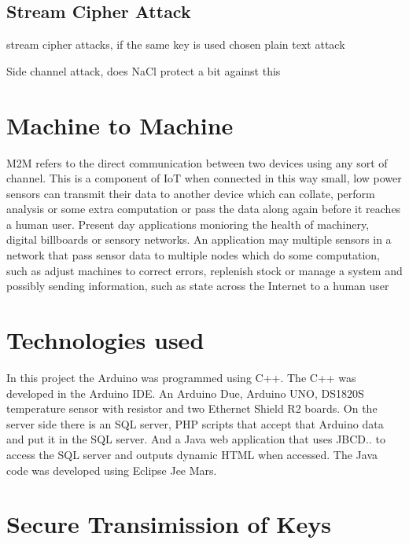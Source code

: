 \subsection{Stream Cipher Attack}

stream cipher attacks, if the same key is used
chosen plain text attack

Side channel attack, does NaCl protect a bit against this

\section{Machine to Machine}

M2M refers to the direct communication between two devices using any sort of channel. This is a component of IoT when connected in this way small, low power sensors can transmit their data to another device which can collate, perform analysis or some extra computation or pass the data along again before it reaches a human user. Present day applications monioring the health of machinery, digital billboards or sensory networks. An application may multiple sensors in a network that pass sensor data to multiple nodes which do some computation, such as adjust machines to correct errors, replenish stock or manage a system and possibly sending information, such as state across the Internet to a human user 

\section{Technologies used}

In this project the Arduino was programmed using C++. The C++ was developed in the Arduino IDE. An Arduino Due, Arduino UNO, DS1820S temperature sensor with resistor and two Ethernet Shield R2 boards. On the server side there is an SQL server, PHP scripts that accept that Arduino data and put it in the SQL server. And a Java web application that uses JBCD.. to access the SQL server and outputs dynamic HTML when accessed. The Java code was developed using Eclipse Jee Mars.

\section{Secure Transimission of Keys}


